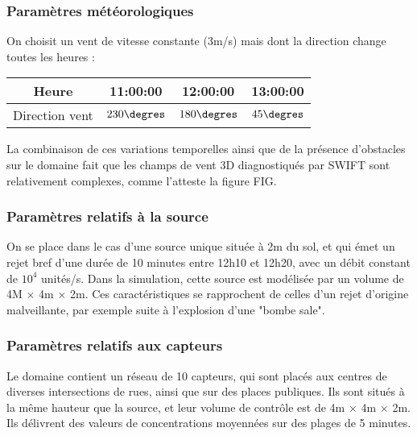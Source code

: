 \subsubsection{Paramètres météorologiques}

On choisit un vent de vitesse constante (3m/s) mais dont la direction change toutes les heures : \\

\begin{center}
\begin{tabular}{cccc}
	\centering
	Heure & 11:00:00 &  12:00:00 &  13:00:00\\ 
	\hline
	 Direction vent & $230\degres$ & $180\degres$ & $45\degres$
\end{tabular} 
\end{center}

La combinaison de ces variations temporelles ainsi que de la présence d'obstacles sur le domaine fait que les champs de vent 3D diagnostiqués par SWIFT sont relativement complexes, comme l'atteste la figure FIG.


\subsubsection{Paramètres relatifs à la source}

On se place dans le cas d'une source unique située à 2m du sol, et qui émet un rejet bref d'une durée de 10 minutes entre 12h10 et 12h20, avec un débit constant de $10^4$ unités/s. Dans la simulation, cette source est modélisée par un volume de 4M $\times$ 4m $\times$ 2m. Ces caractéristiques se rapprochent de celles d'un rejet d'origine malveillante, par exemple suite à l'explosion d'une "bombe sale". \\


\subsubsection{Paramètres relatifs aux capteurs}

Le domaine contient un réseau de 10 capteurs, qui sont placés aux centres de diverses intersections de rues, ainsi que sur des places publiques. Ils sont situés à la même hauteur que la source, et leur volume de contrôle est de 4m $\times$ 4m $\times$ 2m. Ils délivrent des valeurs de concentrations moyennées sur des plages de 5 minutes. \\

